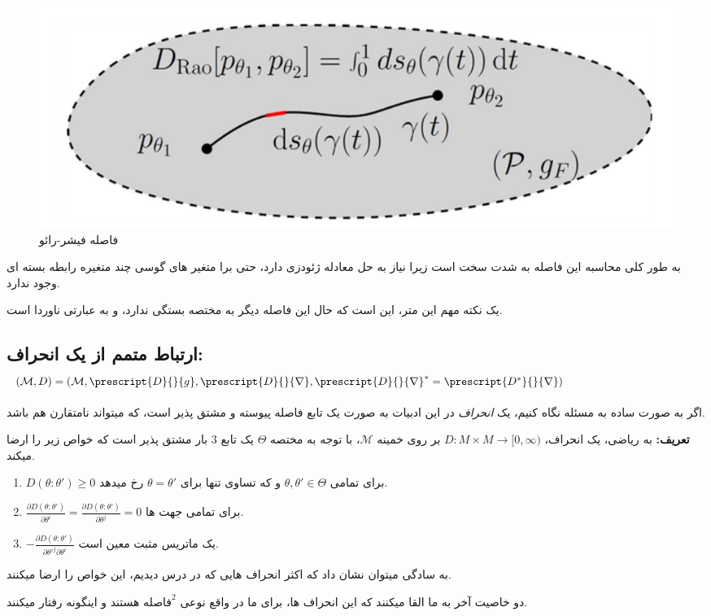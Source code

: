 \begin{figure}[h]
    \centering
    \includegraphics*[width=0.6\linewidth]{Pictures/Q4/rao-distance.png}
    \caption{فاصله فیشر-رائو}
\end{figure}

به طور کلی محاسبه این فاصله به شدت سخت است زیرا نیاز به حل معادله ژئودزی دارد، حتی برا متغیر های گوسی چند متغیره رابطه بسته ای وجود ندارد.

یک نکته مهم این متر، این است که حال این فاصله دیگر به مختصه بستگی ندارد، و به عبارتی ناوردا است.

\subsection{ارتباط متمم از یک انحراف: $(\mathcal{M}, D)=(\mathcal{M}, \prescript{D}{}{g}, \prescript{D}{}{\nabla}, \prescript{D}{}{\nabla}^*=\prescript{D^*}{}{\nabla})$}

اگر به صورت ساده به مسئله نگاه کنیم، یک \textit{انحراف} در این ادبیات به صورت یک تابع فاصله پیوسته و مشتق پذیر است، که میتواند نامتقارن هم باشد.

\textbf{تعریف: } به ریاضی، یک انحراف، $D:M\times M\to[0,\infty)$ بر روی خمینه $\mathcal{M}$، با توجه به مختصه $\Theta$ یک تابع 3 بار مشتق پذیر است که خواص زیر را ارضا میکند.

\begin{enumerate}
    \item $D(\theta:\theta')\geq0$ برای تمامی $\theta, \theta'\in\Theta$ و که تساوی تنها برای $\theta=\theta'$ رخ میدهد.
    \item $\frac{\partial D(\theta:\theta')}{\partial \theta^i}=\frac{\partial D(\theta:\theta')}{\partial \theta^j}=0$ برای تمامی جهت ها.
    \item $-\frac{\partial D(\theta:\theta')}{\partial\theta'^j\partial \theta^i}$ یک ماتریس مثبت معین است.
\end{enumerate}

به سادگی میتوان نشان داد که اکثر انحراف هایی که در درس دیدیم، این خواص را ارضا میکنند.

دو خاصیت آخر به ما القا میکنند که این انحراف ها، برای ما در واقع نوعی $\text{فاصله}^2$ هستند و اینگونه رفتار میکنند.

